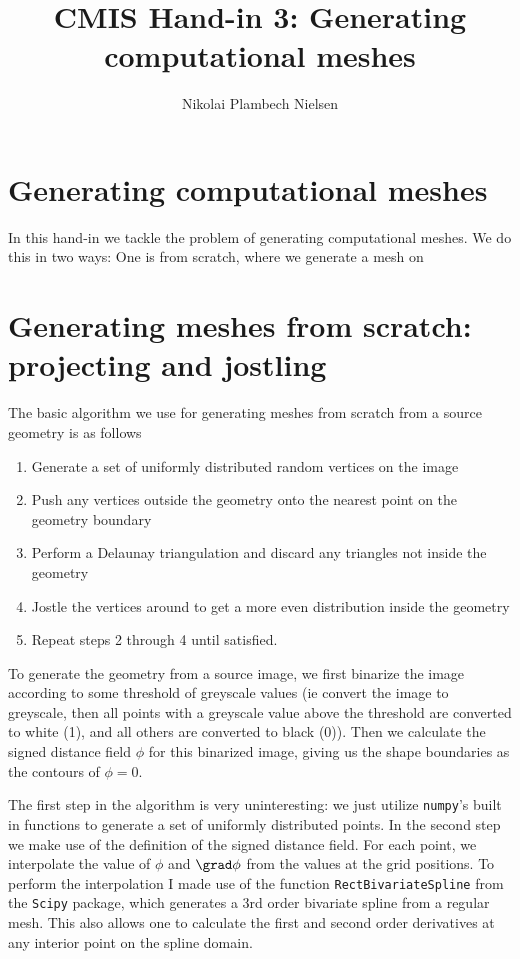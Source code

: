 \documentclass[sigconf]{acmart}
\begin{document}
%
\title{CMIS Hand-in 3: Generating computational meshes}

\author{Nikolai Plambech Nielsen}


\maketitle

\section{Generating computational meshes}
In this hand-in we tackle the problem of generating computational meshes. We do this in two ways: One is from scratch, where we generate a mesh on



\section{Generating meshes from scratch: projecting and jostling}
The basic algorithm we use for generating meshes from scratch from a source geometry is as follows
\begin{enumerate}
	\item Generate a set of uniformly distributed random vertices on the image
	\item Push any vertices outside the geometry onto the nearest point on the geometry boundary
	\item Perform a Delaunay triangulation and discard any triangles not inside the geometry
	\item Jostle the vertices around to get a more even distribution inside the geometry
	\item Repeat steps 2 through 4 until satisfied.
\end{enumerate}
To generate the geometry from a source image, we first binarize the image according to some threshold of greyscale values (ie convert the image to greyscale, then all points with a greyscale value above the threshold are converted to white (1), and all others are converted to black (0)). Then we calculate the signed distance field $ \phi $ for this binarized image, giving us the shape boundaries as the contours of $ \phi = 0 $.

The first step in the algorithm is very uninteresting: we just utilize \texttt{numpy}'s built in functions to generate a set of uniformly distributed points. In the second step we make use of the definition of the signed distance field. For each point, we interpolate the value of $ \phi $ and $ \grad \phi $ from the values at the grid positions. To perform the interpolation I made use of the function \texttt{RectBivariateSpline} from the \texttt{Scipy} package, which generates a 3rd order bivariate spline from a regular mesh. This also allows one to calculate the first and second order derivatives at any interior point on the spline domain.
\end{document}
